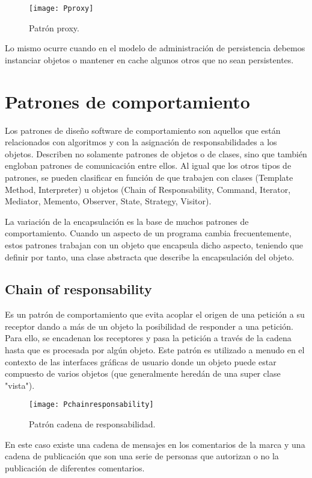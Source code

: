 \begin{figure}[H]
\centering
\texttt{[image: Pproxy]}
\caption{Patrón proxy.}
\end{figure}

Lo mismo ocurre cuando en el modelo de administración de persistencia debemos instanciar objetos o mantener en cache algunos otros que no sean persistentes.

\section{Patrones de comportamiento}

Los patrones de diseño software de comportamiento son aquellos que están relacionados con algoritmos y con la asignación de responsabilidades a los objetos.
Describen no solamente patrones de objetos o de clases, sino que también engloban patrones de comunicación entre ellos. Al igual que los otros tipos de patrones, se pueden clasificar en función de que trabajen con clases (Template Method, Interpreter) u objetos (Chain of Responsability, Command, Iterator, Mediator, Memento, Observer, State, Strategy, Visitor).

La variación de la encapsulación es la base de muchos patrones de comportamiento. Cuando un aspecto de un programa cambia frecuentemente, estos patrones trabajan con un objeto que encapsula dicho aspecto, teniendo que definir por tanto, una clase abstracta que describe la encapsulación del objeto.

\subsection{Chain of responsability}

Es un patrón de comportamiento que evita acoplar el origen de una petición a su receptor dando a más de un objeto la posibilidad de responder a una petición. Para ello, se encadenan los receptores y pasa la petición a través de la cadena hasta que es procesada por algún objeto. Este patrón es utilizado a menudo en el contexto de las interfaces gráficas de usuario donde un objeto puede estar compuesto de varios objetos (que generalmente heredán de una super clase "vista").

\begin{figure}[H]
\centering
\texttt{[image: Pchainresponsability]}
\caption{Patrón cadena de responsabilidad.}
\end{figure}

En este caso existe una cadena de mensajes en los comentarios de la marca y una cadena de publicación que son una serie de personas que autorizan o no la publicación de diferentes comentarios.

